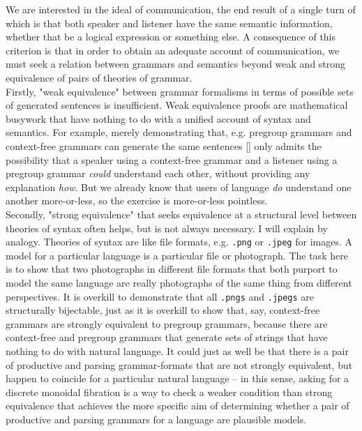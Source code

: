  We are interested in the ideal of communication, the end result of a single turn of which is that both speaker and listener have the same semantic information, whether that be a logical expression or something else. A consequence of this criterion is that in order to obtain an adequate account of communication, we must seek a relation between grammars and semantics beyond weak and strong equivalence of pairs of theories of grammar.\\

Firstly, "weak equivalence" between grammar formalisms in terms of possible sets of generated sentences is insufficient. Weak equivalence proofs are mathematical busywork that have nothing to do with a unified account of syntax and semantics. For example, merely demonstrating that, e.g. pregroup grammars and context-free grammars can generate the same sentences [] only admits the possibility that a speaker using a context-free grammar and a listener using a pregroup grammar \emph{could} understand each other, without providing any explanation \emph{how}. But we already know that users of language \emph{do} understand one another more-or-less, so the exercise is more-or-less pointless.\\

Secondly, "strong equivalence" that seeks equivalence at a structural level between theories of syntax often helps, but is not always necessary. I will explain by analogy. Theories of syntax are like file formats, e.g. \texttt{.png} or \texttt{.jpeg} for images. A model for a particular language is a particular file or photograph. The task here is to show that two photographs in different file formats that both purport to model the same language are really photographs of the same thing from different perspectives. It is overkill to demonstrate that all \texttt{.pngs} and \texttt{.jpegs} are structurally bijectable, just as it is overkill to show that, say, context-free grammars are strongly equivalent to pregroup grammars, because there are context-free and pregroup grammars that generate sets of strings that have nothing to do with natural language. It could just as well be that there is a pair of productive and parsing grammar-formats that are not strongly equivalent, but happen to coincide for a particular natural language -- in this sense, asking for a discrete monoidal fibration is a way to check a weaker condition than strong equivalence that achieves the more specific aim of determining whether a pair of productive and parsing grammars for a language are plausible models.\\

